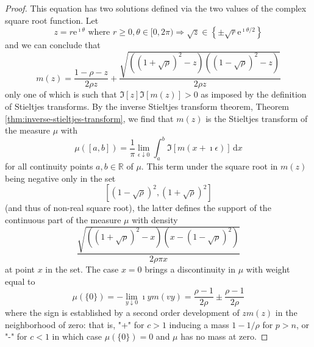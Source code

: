 \begin{proof}
    This equation has two solutions defined via the two values of the complex square root function. Let
    \begin{equation*}
        z=r\mathrm{e}^{\imath\theta}\text{ where }r\geq 0,\theta\in[0,2\pi)\Rightarrow\sqrt{z}\in\left\{\pm\sqrt{r}\mathrm{e}^{\imath\theta/2}\right\}
    \end{equation*}
    and we can conclude that
    \begin{equation*}
        m(z)=\frac{1-\rho-z}{2\rho z}+\frac{\sqrt{\left((1+\sqrt{\rho})^{2}-z\right)\left((1-\sqrt{\rho})^{2}-z\right)}}{2\rho z}
    \end{equation*}
    only one of which is such that $\Im[z]\Im[m(z)]>0$ as imposed by the definition of Stieltjes transforms. By the inverse Stieltjes transform theorem, Theorem \ref{thm:inverse-stieltjes-transform}, we find that $m(z)$ is the Stieltjes transform of the measure $\mu$ with
    \begin{equation*}
        \mu([a,b])=\frac{1}{\pi}\lim_{\epsilon\downarrow 0}\int_{a}^{b}\Im[m(x+\imath\epsilon)]\,\mathrm{d}x
    \end{equation*}
    for all continuity points $a,b\in\mathbb{R}$ of $\mu$. This term under the square root in $m(z)$ being negative only in the set
    \begin{equation*}
        \left[(1-\sqrt{\rho})^{2},(1+\sqrt{\rho})^{2}\right]
    \end{equation*}
    (and thus of non-real square root), the latter defines the support of the continuous part of the measure $\mu$ with density
    \begin{equation*}
        \frac{\sqrt{\left((1+\sqrt{\rho})^{2}-x\right)\left(x-(1-\sqrt{\rho})^{2}\right)}}{2\rho\pi x}
    \end{equation*}
    at point $x$ in the set. The case $x=0$ brings a discontinuity in $\mu$ with weight equal to
    \begin{equation*}
        \mu(\{0\})=-\lim_{y\downarrow 0}\imath ym(vy)=\frac{\rho-1}{2\rho}\pm\frac{\rho-1}{2\rho}
    \end{equation*}
    where the sign is established by a second order development of $z m(z)$ in the neighborhood of zero: that is, "+" for $c>1$ inducing a mass $1-1/\rho$ for $p>n$, or "-" for $c<1$ in which case $\mu(\{0\})=0$ and $\mu$ has no mass at zero.
\end{proof}
